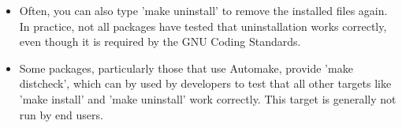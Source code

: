 \begin{itemize}
 \item Often, you can also type 'make uninstall' to remove the installed
 files again.  In practice, not all packages have tested that
 uninstallation works correctly, even though it is required by the
 GNU Coding Standards.
 
\item Some packages, particularly those that use Automake, provide 'make
 distcheck', which can by used by developers to test that all other
 targets like 'make install' and 'make uninstall' work correctly.
 This target is generally not run by end users.
\end{itemize}